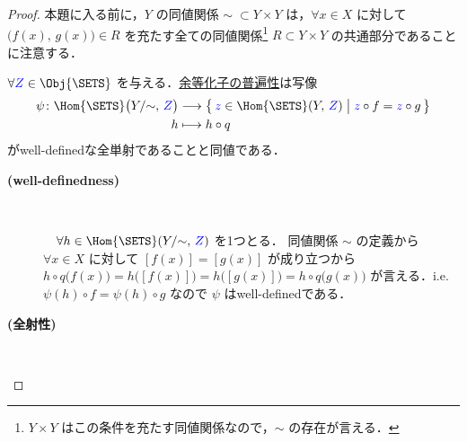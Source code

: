 \documentclass[geometry_main]{subfiles}
\begin{document}
\begin{proof}
	本題に入る前に，$Y$ の同値関係 $\sim \; \subset Y \times Y$ は，$\forall x \in X$ に対して $\bigl( f(x),\, g(x) \bigr) \in R$ を充たす全ての同値関係\footnote{$Y \times Y$ はこの条件を充たす同値関係なので，${\sim}$ の存在が言える．} $R \subset Y \times Y$ の共通部分であることに注意する．
	
	$\forall \textcolor{blue}{Z} \in \Obj{\SETS}$ を与える．\hyperref[cmtd:univ-coequalizer]{余等化子の普遍性}は写像
	\begin{align}
		\psi \colon \Hom{\SETS} \bigl(Y/{\sim},\, \textcolor{blue}{Z}\bigr) &\lto \bigl\{\, \textcolor{blue}{z} \in \Hom{\SETS}(Y,\, \textcolor{blue}{Z}) \bigm| \textcolor{blue}{z} \circ f = \textcolor{blue}{z} \circ g \,\bigr\} \\
		h &\lmto h \circ q
	\end{align}
	がwell-definedな全単射であることと同値である．
	\begin{description}
		\item[\textbf{(well-definedness)}] 　
		
		　$\forall h \in \Hom{\SETS} (Y/{\sim},\, \textcolor{blue}{Z})$ を1つとる．
		同値関係 $\sim$ の定義から $\forall x \in X$ に対して $[f(x)] = [g(x)]$ が成り立つから
		$h \circ q \bigl( f(x) \bigr) = h \bigl( [f(x)] \bigr) = h \bigl( [g(x)] \bigr) = h\circ q \bigl( g(x) \bigr)$ 
		が言える．i.e. $\psi(h) \circ f = \psi(h) \circ g$ なので $\psi$ はwell-definedである．
		
		\item[\textbf{(全射性)}] 　
		

\end{description}
\end{proof}
\end{document}
